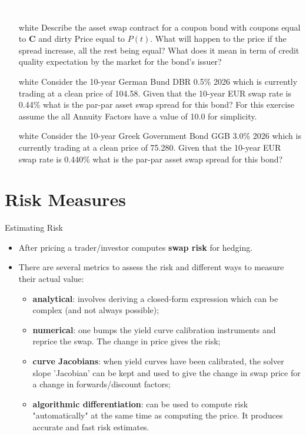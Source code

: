 \documentclass{beamer}
\begin{document}
\begin{homework}
\begin{frame}{\textcolor{white}{Homework}}
\begin{itemize}
\item[white] Describe the asset swap contract for a coupon bond with coupons equal to \textbf{C} and dirty Price equal to $P(t)$. What will happen to the price if the spread increase, all the rest being equal? What does it mean in term of credit quality expectation by the market for the bond's issuer?
\item[white]  Consider the 10-year German Bund DBR 0.5\% 2026 which is currently trading at a clean price of 104.58. 
Given that the 10-year EUR swap rate is 0.44\% what is the par-par asset swap spread for this bond? 
For this exercise assume the all Annuity Factors have a value of 10.0 for simplicity.
\item[white] Consider the 10-year Greek Government Bond GGB 3.0\% 2026 which is currently trading at a clean price of 75.280. Given that the 10-year EUR swap rate is 0.440\% what is the par-par asset swap spread for this bond?
\end{itemize}
\end{frame}
\end{homework}


\section{Risk Measures}
\begin{frame}{Estimating Risk}
\begin{itemize}
\item After pricing a trader/investor computes \textbf{swap risk} for hedging.
\item There are several metrics to assess the risk and different ways to measure their actual value:
\begin{itemize}
	\item \textbf{analytical}: involves deriving a closed-form expression which can be complex (and not always possible);
	\item \textbf{numerical}: one bumps the yield curve calibration instruments and reprice the swap. The change in price gives the risk;
	\item \textbf{curve Jacobians}: when yield curves have been calibrated, the solver slope 'Jacobian' can be kept and used to give the change in swap price for a change in forwards/discount factors;
	\item \textbf{algorithmic differentiation}: can be used to compute risk "automatically" at the same time as computing the price. It produces accurate and fast risk estimates.
\end{itemize}
\end{itemize}
\end{frame}
\end{document}
